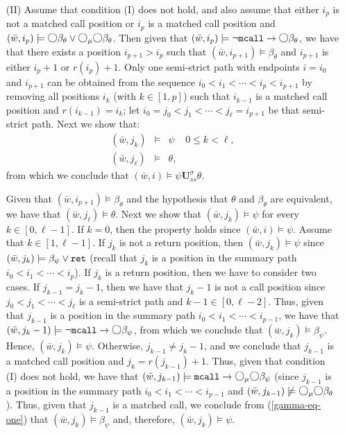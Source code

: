 \documentclass{LMCS}
\newcommand{\M}{{\mu}}
\newcommand{\w}{{\bar{w}}}
\newcommand{\dm}{\Diamond}
\newcommand{\U}{{\mathbf U}}
\newcommand{\next}{\text{\raisebox{1pt}{$\bigcirc$}}}
\theoremstyle{plain}
\theoremstyle{definition}
\newcommand{\ppath}{\sigma} \newcommand{\Ul}{\U}
\newcommand{\Up}{\U^\ppath}
\newcommand{\Uss}{\Up_{ss}}
\newcommand{\mcall}{{\tt{mcall}}}
\newcommand{\rett}{{\tt ret}}
\newcommand{\dmm}{\dm_{\M}}
\renewcommand{\dm}{\next}
\renewcommand{\dmm}{\dm_\M}
\begin{document}
\begin{enumerate}[(a)]
\item[(II)] Assume that condition (I) does not hold, and also assume
that either $i_p$ is not a matched call position or $i_p$ is a matched
call position and $(\w, i_p) \models \dm \beta_\theta
\vee \dmm \dm \beta_\theta$. Then given that $(\w, i_p) \models \neg
\mcall \to \dm \beta_\theta$, we have that there exists a position
$i_{p+1} > i_p$ 
such that $(\w, i_{p+1}) \models  \beta_\theta$ and $i_{p+1}$ is
either $i_p+1$ or $r(i_p)+1$. Only one
semi-strict path with endpoints $i = i_0$ and $i_{p+1}$ can be
obtained from the sequence $i_0 < i_1 < \cdots < i_p < i_{p+1}$ by
removing all positions $i_k$ (with $k \in [1, p]$) such that $i_{k-1}$
is a matched call position and $r(i_{k-1}) = i_k$; let $i_0 = j_0 < j_1 <
\cdots < j_\ell = i_{p+1}$ be that semi-strict path. Next we
show that:
\begin{eqnarray*}
(\w, j_k) & \models & \psi \ \ \ \ \ 0 \leq k < \ell,\\
(\w, j_\ell) & \models & \theta,
\end{eqnarray*}
from which we conclude that $(\w, i) \models \psi \Uss \theta$. 

Given that $(\w, i_{p+1}) \models \beta_\theta$ and the hypothesis that
$\theta$ and $\beta_\theta$ are equivalent, we have that $(\w, j_\ell)
\models \theta$. Next we show that $(\w, j_k) \models \psi$ for every
$k \in [0,\ell-1]$. If $k = 0$, then the property holds since $(\w, i)
\models \psi$.
Assume that $k \in [1,\ell-1]$. If $j_k$ is not a return
position, then $(\w, j_k) \models \psi$ since $(\w, j_k) \models
\beta_\psi \vee \rett$ (recall that $j_k$ is a position in the summary
path $i_0 < i_1 < \cdots <i_p$). If $j_k$ is a return position, then we have
to consider two cases. If $j_{k-1} = j_k-1$, then we have that $j_k-1$
is not a call position since $j_0 < j_1 < \cdots < j_\ell$ is a
semi-strict path and $k-1 \in [0,\ell-2]$. Thus, given that
$j_{k-1}$ is a position in the summary path $i_0 < i_1 < \cdots <
i_{p-1}$, we have that $(\w, j_k-1)
\models \neg \mcall \to \dm \beta_\psi$, from which we conclude that
$(\w, j_k) \models \beta_\psi$. Hence, $(\w, j_k) \models
\psi$. Otherwise, $j_{k-1} \neq j_k-1$, and we conclude that $j_{k-1}$
is a matched call position and $j_k = r(j_{k-1}) + 1$. Thus, given
that condition (I) does not hold, we have that $(\w, j_{k-1}) \models
\mcall \to \dmm \dm \beta_\psi$ (since $j_{k-1}$ is a position in the
summary path $i_0 < i_1 < \cdots < i_{p-1}$ and 
$(\w,j_{k-1}) \not\models \dmm\dm\beta_\theta$). Thus, given that
$j_{k-1}$ is a matched call, we conclude from (\ref{gamma-eq-one}) that $(\w, j_k)
\models \beta_\psi$ and, therefore, $(\w, j_k) \models \psi$.  


\end{enumerate}
\end{document}
